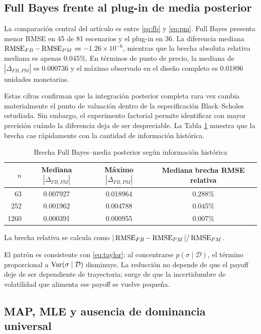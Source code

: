 \subsection{Full Bayes frente al plug-in de media posterior}

La comparación central del artículo es entre \eqref{eq:fb} y \eqref{eq:pm}. Full Bayes presenta menor RMSE en 45 de 81 escenarios y el plug-in en 36. La diferencia mediana $\operatorname{RMSE}_{FB}-\operatorname{RMSE}_{PM}$ es $-1.26\times10^{-6}$, mientras que la brecha absoluta relativa mediana es apenas 0.045\%. En términos de punto de precio, la mediana de $|\Delta_{FB,PM}|$ es 0.000736 y el máximo observado en el diseño completo es 0.01896 unidades monetarias.

Estas cifras confirman que la integración posterior completa rara vez cambia materialmente el punto de valuación dentro de la especificación Black--Scholes estudiada. Sin embargo, el experimento factorial permite identificar con mayor precisión cuándo la diferencia deja de ser despreciable. La Tabla \ref{tab:fbpm_n} muestra que la brecha cae rápidamente con la cantidad de información histórica.

\begin{table}[H]
\centering
\caption{Brecha Full Bayes--media posterior según información histórica}
\label{tab:fbpm_n}
\begin{tabular}{rccc}
\toprule
$n$ & Mediana $|\Delta_{FB,PM}|$ & Máximo $|\Delta_{FB,PM}|$ & Mediana brecha RMSE relativa \\
\midrule
63   & 0.007927 & 0.018964 & 0.288\% \\
252  & 0.001962 & 0.004788 & 0.045\% \\
1260 & 0.000391 & 0.000955 & 0.007\% \\
\bottomrule
\end{tabular}

\vspace{0.15cm}
\footnotesize La brecha relativa se calcula como $|\operatorname{RMSE}_{FB}-\operatorname{RMSE}_{PM}|/\operatorname{RMSE}_{PM}$.
\end{table}

El patrón es consistente con \eqref{eq:taylor}: al concentrarse $p(\sigma\mid\mathcal D)$, el término proporcional a $\operatorname{Var}(\sigma\mid\mathcal D)$ disminuye. La reducción no depende de que el payoff deje de ser dependiente de trayectoria; surge de que la incertidumbre de volatilidad que alimenta ese payoff se vuelve pequeña.

\subsection{MAP, MLE y ausencia de dominancia universal}


